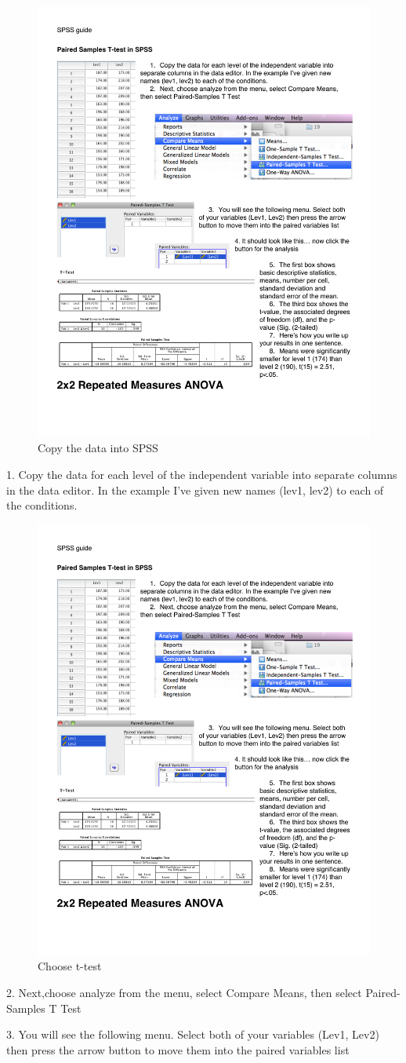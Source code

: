 \begin{figure}
      \includegraphics[width=.5\linewidth]{LabmanualFigures/SPSS1.pdf}
      \caption{Copy the data into SPSS}
      \label{fig:spss1}
\end{figure}

1. Copy the data for each level of the independent variable into separate columns in the data editor. In the example I've given new names (lev1, lev2) to each of the conditions.


\begin{figure}
      \includegraphics[width=.5\linewidth]{LabmanualFigures/SPSS2.pdf}
      \caption{Choose t-test}
      \label{fig:SPSS2}
\end{figure}

2. Next,choose analyze from the menu, select Compare Means, then select Paired-Samples T Test


3. You will see the following menu. Select both of your variables (Lev1, Lev2) then press the arrow button to move them into the paired variables list
   

